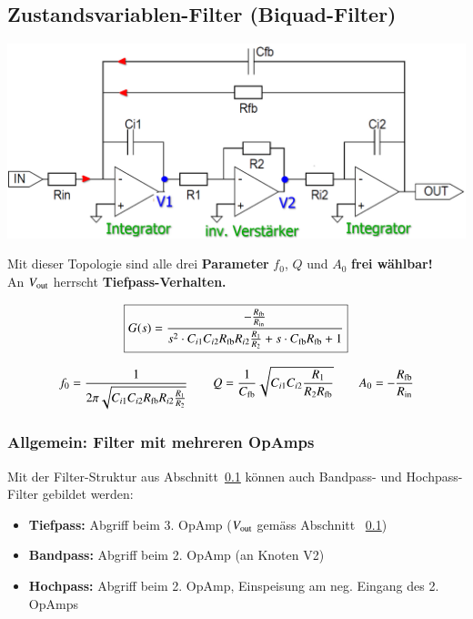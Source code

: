 \subsection{Zustandsvariablen-Filter (Biquad-Filter)}
\label{zustandsvariablenfilter}

\begin{minipage}[c]{0.6\columnwidth}
    \includegraphics[width=\columnwidth]{images/zustandsvariablenfilter.png}
\end{minipage}
\hfill
\begin{minipage}[c]{0.38\columnwidth}
    \raggedright%
    Mit dieser Topologie sind alle drei \textbf{Parameter} $f_0$, $Q$ und $A_0$ \textbf{frei wählbar!} \\
    An $V_{\rm out}$ herrscht \textbf{Tiefpass-Verhalten.}
\end{minipage}

$$ \boxed{ G(s) = \frac{- \frac{R_{\rm fb}}{R_{\rm in}}}{s^2 \cdot C_{i1} C_{i2} R_{\rm fb} R_{i2} \frac{R_1}{R_2} + s \cdot C_{\rm fb} R_{\rm fb} + 1} } $$

$$ f_0 = \frac{1}{2 \pi \sqrt{C_{i1} C_{i2} R_{\rm fb} R_{i2} \frac{R_1}{R_2}}} \qquad Q = \frac{1}{C_{\rm fb}} \sqrt{C_{i1} C_{i2} \frac{R_1}{R_2 R_{\rm fb}} } 
\qquad A_0 = - \frac{R_{\rm fb}}{R_{\rm in}} $$


\subsubsection{Allgemein: Filter mit mehreren OpAmps}

Mit der Filter-Struktur aus Abschnitt~\ref{zustandsvariablenfilter} können auch Bandpass- und Hochpass-Filter gebildet werden:
\begin{itemize}
    \item \textbf{Tiefpass:} Abgriff beim 3. OpAmp ($V_{\rm out}$ gemäss Abschnitt ~\ref{zustandsvariablenfilter})
    \item \textbf{Bandpass:} Abgriff beim 2. OpAmp (an Knoten V2)
    \item \textbf{Hochpass:} Abgriff beim 2. OpAmp, Einspeisung am neg. Eingang des 2. OpAmps 
\end{itemize}

